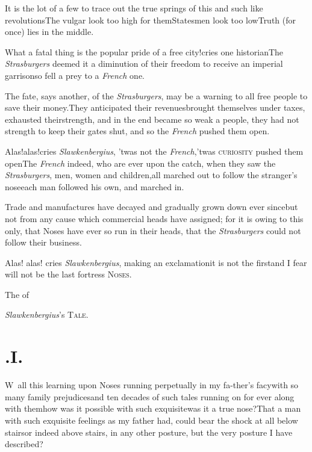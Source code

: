 \documentclass{article}
\begin{document}
It is the lot of a few to trace out the true springs of this and
such like revolutions\tsk The vulgar look too high for
them\tsk Statesmen look too low\tsk Truth (for once)
lies in the middle.

\newpage
What a fatal thing is the popular pride of a free city!\@ cries
one historian\tsk The \textit{Strasburgers} deemed it a diminution
of their freedom to receive an imperial garrison\tsk so
fell a prey to a \textit{French} one.

The fate, says another, of the \textit{Strasburgers}, may be a
warning to all free people to save their money.\tsk They
anticipated their revenues\tsk brought themselves under
taxes, exhausted their\break strength, and in the end became so weak a
people, they had not strength to keep their gates shut, and so the
\textit{French} pushed them open.

Alas!\@ alas!\@ cries \textit{Slawkenbergius}, ’twas not the
\textit{French},\tsk ’twas \textsc{curiosity}
pushed them open\tsk The \textit{French} indeed, who are
ever upon the catch, when they saw the \textit{Strasburgers}, men,
women and children,\pb all marched out to follow the stranger’s
nose\tsh each man followed his own, and marched in.

Trade and manufactures have decayed and gradually grown down
ever since\tsk but not from any cause which commercial heads have
assigned; for it is owing to this only, that Noses have ever so run
in their heads, that the \textit{Strasburgers} could not follow their
business.

Alas! alas! cries \textit{Slawkenbergius}, making an
exclamation\tsk it is not the first\tsh and I fear will not be the last
fortress
\break
\textsc{Noses}.

\bigskip
\centerline{The  of}
\centerline{\textit{Slawkenbergius}’s \textsc{Tale}.}


\section{.\enspace I.}

\lettrine{W}{\,} all this learning upon Noses
running perpetually in my fa-\break ther’s facy\tsk with so
many family prejudices\tsk and ten decades of such tales
running on for ever along with them\tsk how was it possible
with such exquisite\tsk was it a true nose?\tsk That a man
with such exquisite feelings as my father had, could bear
the shock at all below stairs\tsk or indeed above stairs, in
any other posture, but the very posture I have described?
\end{document}
